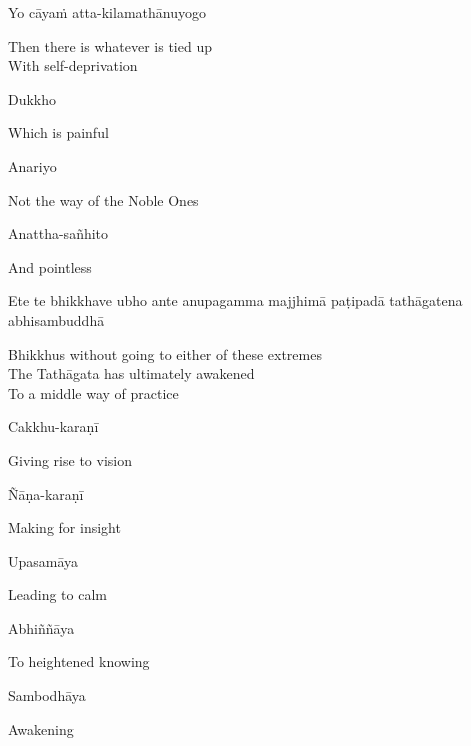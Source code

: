 Yo cāyaṁ atta-kilamathānuyogo

\begin{cprenglish}
Then there is whatever is tied up\\
With self-deprivation
\end{cprenglish}

Dukkho

\begin{cprenglish}
Which is painful
\end{cprenglish}

Anariyo

\begin{cprenglish}
Not the way of the Noble Ones
\end{cprenglish}

Anattha-sañhito

\begin{cprenglish}
And pointless
\end{cprenglish}

Ete te bhikkhave ubho ante anupagamma majjhimā paṭipadā tathāgatena abhisambuddhā

\begin{cprenglish}
Bhikkhus without going to either of these extremes\\
The Tathāgata has ultimately awakened\\
To a middle way of practice
\end{cprenglish}

Cakkhu-karaṇī

\begin{cprenglish}
Giving rise to vision
\end{cprenglish}

Ñāṇa-karaṇī

\begin{cprenglish}
Making for insight
\end{cprenglish}

Upasamāya

\begin{cprenglish}
Leading to calm
\end{cprenglish}

Abhiññāya

\begin{cprenglish}
To heightened knowing
\end{cprenglish}

Sambodhāya

\begin{cprenglish}
Awakening
\end{cprenglish}

